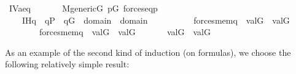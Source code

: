 \begin{isabelle}
\isamarkupfalse%
\ IV{}{}{}a{\isacharunderscore}eq{\isacharcolon}\isanewline
\ \ \isanewline
\ \ \ \ {\isachardoublequoteopen}M{\isacharunderscore}generic{\isacharparenleft}G{\isacharparenright}{\isachardoublequoteclose}\ {\isachardoublequoteopen}p{\isasymin}G{\isachardoublequoteclose}\ {\isachardoublequoteopen}forces{\isacharunderscore}eq{\isacharparenleft}p{\isacharcomma}{\isasymtau}{\isacharcomma}{\isasymtheta}{\isacharparenright}{\isachardoublequoteclose}\isanewline
\ \ \ \ \isanewline
\ \ \ \ IH{\isacharcolon}{\isachardoublequoteopen}{\isasymAnd}q\ {\isasymsigma}{\isachardot}\ q{\isasymin}P\ {\isasymLongrightarrow}\ q{\isasymin}G\ {\isasymLongrightarrow}\ {\isasymsigma}{\isasymin}domain{\isacharparenleft}{\isasymtau}{\isacharparenright}\ {\isasymunion}\ domain{\isacharparenleft}{\isasymtheta}{\isacharparenright}\ {\isasymLongrightarrow}\ \isanewline
\ \ \ \ \ \ \ \ {\isacharparenleft}forces{\isacharunderscore}mem{\isacharparenleft}q{\isacharcomma}{\isasymsigma}{\isacharcomma}{\isasymtau}{\isacharparenright}\ {\isasymlongrightarrow}\ val{\isacharparenleft}G{\isacharcomma}{\isasymsigma}{\isacharparenright}\ {\isasymin}\ val{\isacharparenleft}G{\isacharcomma}{\isasymtau}{\isacharparenright}{\isacharparenright}\ {\isasymand}\isanewline
\ \ \ \ \ \ \ \ {\isacharparenleft}forces{\isacharunderscore}mem{\isacharparenleft}q{\isacharcomma}{\isasymsigma}{\isacharcomma}{\isasymtheta}{\isacharparenright}\ {\isasymlongrightarrow}\ val{\isacharparenleft}G{\isacharcomma}{\isasymsigma}{\isacharparenright}\ {\isasymin}\ val{\isacharparenleft}G{\isacharcomma}{\isasymtheta}{\isacharparenright}{\isacharparenright}{\isachardoublequoteclose}\isanewline
\ \ \isanewline
\ \ \ \ {\isachardoublequoteopen}val{\isacharparenleft}G{\isacharcomma}{\isasymtau}{\isacharparenright}\ {\isacharequal}\ val{\isacharparenleft}G{\isacharcomma}{\isasymtheta}{\isacharparenright}{\isachardoublequoteclose}
\end{isabelle}

As an example of the second kind of induction (on formulas), we choose the
following relatively simple result:

